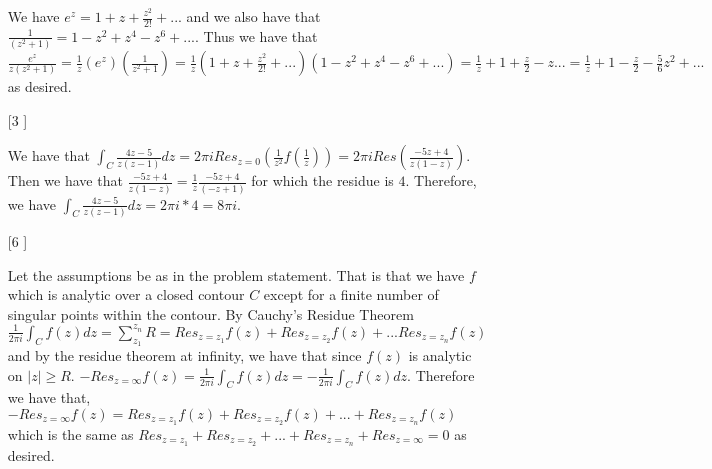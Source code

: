 \documentclass{article}
\theoremstyle{definition}
\begin{document}
\begin{enumerate}
    We have $e^z = 1 + z + \frac{z^2}{2!} + ...$ and we also have that $\frac{1}{(z^2 + 1)} = 1 - z^2 + z^4 - z^6 + ...$. Thus we have that $\frac{e^z}{z(z^2 + 1)} = \frac{1}{z}(e^z)(\frac{1}{z^2 + 1}) = \frac{1}{z}(1 + z + \frac{z^2}{2!} + ...)(1 - z^2 + z^4 - z^6 + ...) = \frac{1}{z} + 1 + \frac{z}{2} - z ... = \frac{1}{z} + 1 - \frac{z}{2} - \frac{5}{6}z^2 + ...$ as desired.
    
    \item [[\phantom{-}3]]
    
    We have that $\int_C\frac{4z-5}{z(z-1)}dz = 2\pi iRes_{z = 0}(\frac{1}{z^2}f(\frac{1}{z})) = 2\pi i Res(\frac{-5z + 4}{z(1 - z)})$. Then we have that $\frac{-5z + 4}{z(1 - z)} = \frac{1}{z}\frac{-5z + 4}{(-z + 1)}$ for which the residue is $4$. Therefore, we have $\int_C\frac{4z-5}{z(z - 1)}dz = 2\pi i * 4 = 8\pi i.$
    
    \item [[\phantom{-}6]]
    
    Let the assumptions be as in the problem statement. That is that we have $f$ which is analytic over a closed contour $C$ except for a finite number of singular points within the contour. By Cauchy's Residue Theorem $\frac{1}{2\pi i}\int_Cf(z)dz = \sum_{z_1}^{z_n}R = Res_{z = z_1}f(z) + Res_{z = z_2}f(z) + ... Res_{z = z_n}f(z)$ and by the residue theorem at infinity, we have that since $f(z)$ is analytic on $|z| \geq R$. $-Res_{z = \infty}f(z) = \frac{1}{2\pi i}\int_{C}f(z)dz = -\frac{1}{2\pi i}\int_Cf(z)dz.$ Therefore we have that, $-Res_{z = \infty}f(z) = Res_{z = z_1}f(z) + Res_{z = z_2}f(z) + ... + Res_{z = z_n}f(z)$ which is the same as $Res_{z = z_1} + Res_{z = z_2} + ... + Res_{z = z_n} + Res_{z = \infty} = 0$ as desired.
    
\end{enumerate}
\end{document}
